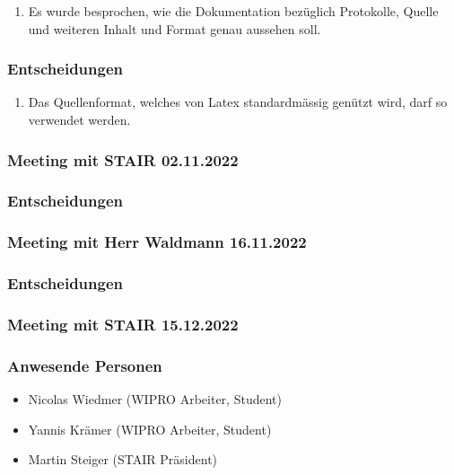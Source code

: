 \documentclass[a4paper, table]{article}
\begin{document}
\begin{enumerate}
    \item Es wurde besprochen, wie die Dokumentation bezüglich Protokolle, Quelle und weiteren Inhalt und Format genau aussehen soll.
\end{enumerate}

\subsubsection*{Entscheidungen}

\begin{enumerate}
    \item Das Quellenformat, welches von Latex standardmässig genützt wird, darf so verwendet werden.
\end{enumerate}

\newpage
\subsubsection{Meeting mit STAIR 02.11.2022}

\subsubsection*{Entscheidungen}

\newpage
\subsubsection{Meeting mit Herr Waldmann 16.11.2022}

\subsubsection*{Entscheidungen}

\newpage
\subsubsection{Meeting mit STAIR 15.12.2022}

\subsubsection*{Anwesende Personen}

\begin{itemize}
    \item Nicolas Wiedmer (WIPRO Arbeiter, Student)
    \item Yannis Krämer (WIPRO Arbeiter, Student)
    \item Martin Steiger (STAIR Präsident)
\end{itemize}
\end{document}
